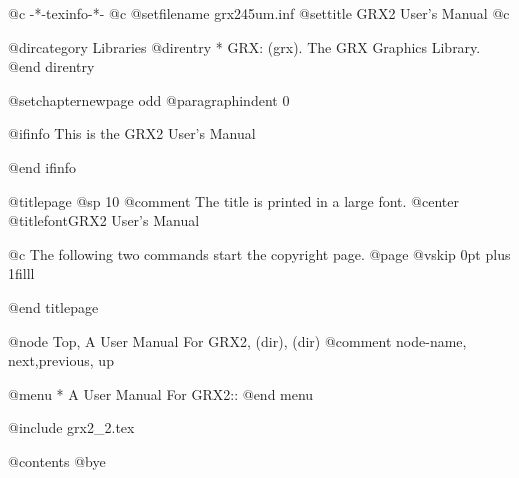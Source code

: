    @c -*-texinfo-*-
@c %
@setfilename grx245um.inf
@settitle GRX2 User's Manual
@c %

@dircategory Libraries
@direntry
* GRX: (grx).                   The GRX Graphics Library.
@end direntry

@setchapternewpage odd
@paragraphindent 0

@ifinfo
This is the GRX2 User's Manual

@end ifinfo

@titlepage
@sp 10
@comment The title is printed in a large font.
@center @titlefont{GRX2 User's Manual}

@c The following two commands start the copyright page.
@page
@vskip 0pt plus 1filll

@end titlepage


@node  Top, A User Manual For GRX2, (dir), (dir)
@comment node-name, next,previous, up

@menu
* A User Manual For GRX2::
@end menu

@include grx2_2.tex

@contents
@bye

